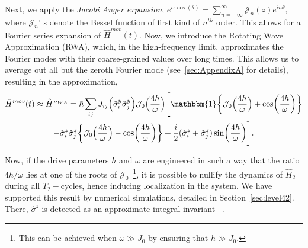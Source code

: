 \documentclass[12pt]{iopart}
\begin{document}
Next, we apply the \textit{Jacobi Anger expansion}, $\displaystyle e^{iz \cos(\theta)} = \sum_{n=-\infty}^{\infty} \mathcal{J}_n(z) e^{in\theta}$, where $\mathcal{J}_n$' s denote the Bessel function of first kind of $n^{th}$ order. This allows for a Fourier series expansion of $\hat{H}^{mov}(t)$. Now, we introduce the Rotating Wave Approximation (RWA), which, in the high-frequency limit, approximates the Fourier modes with their coarse-grained values over long times. This allows us to average out all but the zeroth Fourier mode (see~\ref{sec:AppendixA} for details), resulting in the approximation,
\begin{multline}
    \hat{H}^{mov}(t)\approx \hat{H}^{_{RWA}} = \hbar\sum_{ij} J_{ij} \Big(\hat{\sigma}^y_i\hat{\sigma}^y_j\Big) \mathcal{J}_0\Big(\frac{4h}{\omega}\Big)
    \Bigg[\mathbbm{1}\bigg\{\mathcal{J}_0\Big(\frac{4h}{\omega}\Big) + \cos(\frac{4h}{\omega})\bigg\}\\
    -\hat{\sigma}^z_i\hat{\sigma}^z_j \bigg\{\mathcal{J}_0\Big(\frac{4h}{\omega}\Big)- \cos(\frac{4h}{\omega})\bigg\} + \frac{i}{2} (\hat{\sigma}^z_i + \hat{\sigma}^z_j) \sin(\frac{4h}{\omega})\Bigg].
    \label{eq:movham1}
\end{multline}
	
Now, if the drive parameters $h$ and $\omega$  are {engineered} in such a way that the ratio ${4h}/{\omega}$ lies at one of the roots of $\mathcal{J}_0$~\footnote{This can be achieved when $\omega \gg J_0$ by ensuring that $h\gg J_0$.}, it is possible to nullify the dynamics of $\hat{H}_2$ during all $T_2-$cycles, hence inducing localization in the system. We have supported this result by numerical simulations, detailed in Section~\ref{sec:level42}. There, $\hat{\sigma}^z$ is detected as an approximate integral invariant ~\cite{Keser2016,Dodonov1978}. 
\end{document}
